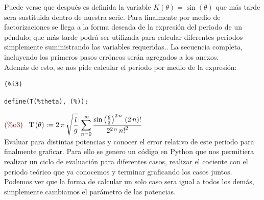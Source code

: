 \documentclass[12pt]{article}
\begin{document}
Puede verse que después es definida la variable $K(\theta) = \sin(\theta)$ que más tarde sera sustituida dentro de nuestra serie. Para finalmente por medio de factorizaciones se llega a la forma deseada de la expresión del periodo de un péndulo; que más tarde podrá ser utilizada para calcular diferentes periodos simplemente suministrando las variables requeridas.. La secuencia completa, incluyendo los primeros pasos erróneos serán agregados a los anexos.\\

Además de esto, se nos pide calcular el periodo por medio de la expresión:\\


\noindent
\begin{minipage}[t]{8ex}{\color{red}\bf
\begin{verbatim}
(%i3) 
\end{verbatim}}
\end{minipage}
\begin{minipage}[t]{\textwidth}{\color{blue}
\begin{verbatim}
define(T(%theta), (%));
\end{verbatim}}
\end{minipage}
\begin{math}\displaystyle
\parbox{8ex}{\color{labelcolor}(\%o3) }
\mathrm{T}\left( \theta\right) :=2\,\pi \,\sqrt{\frac{l}{g}}\,\sum_{n=0}^{\infty }\frac{{\mathrm{sin}\left( \frac{\theta}{2}\right) }^{2\,n}\,\left( 2\,n\right) !}{{2}^{2\,n}\,{n!}^{2}}
\end{math}\\

Evaluar para distintas potencias y conocer el error relativo de este periodo para finalmente graficar. Para ello se genero un código en Python que nos permitiera realizar un ciclo de evaluaci\'on para diferentes casos, realizar el cociente con el periodo teórico que ya conocemos y terminar graficando los casos juntos.\\

Podemos ver que la forma de calcular un solo caso sera igual a todos los demás, simplemente cambiamos el parámetro de las potencias.
\end{document}
